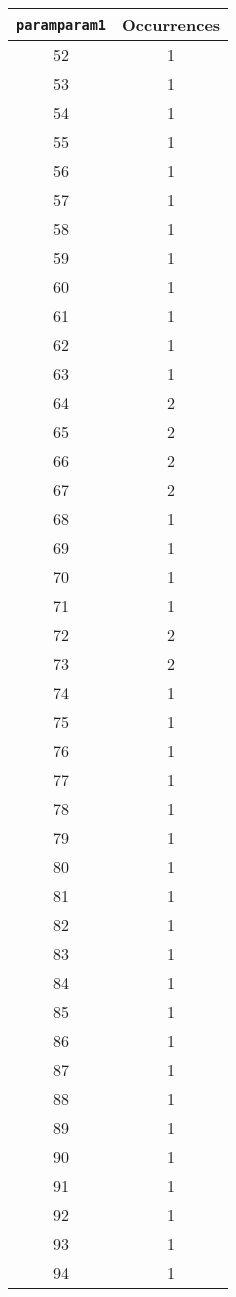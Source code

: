 \documentclass[letterpaper, 12pt]{article}
\begin{document}
\begin{longtable}{|c|c|}
\hline
\textbf{\texttt{paramparam1}} & \textbf{Occurrences} \\
\hline
52 & 1 \\
\hline
53 & 1 \\
\hline
54 & 1 \\
\hline
55 & 1 \\
\hline
56 & 1 \\
\hline
57 & 1 \\
\hline
58 & 1 \\
\hline
59 & 1 \\
\hline
60 & 1 \\
\hline
61 & 1 \\
\hline
62 & 1 \\
\hline
63 & 1 \\
\hline
64 & 2 \\
\hline
65 & 2 \\
\hline
66 & 2 \\
\hline
67 & 2 \\
\hline
68 & 1 \\
\hline
69 & 1 \\
\hline
70 & 1 \\
\hline
71 & 1 \\
\hline
72 & 2 \\
\hline
73 & 2 \\
\hline
74 & 1 \\
\hline
75 & 1 \\
\hline
76 & 1 \\
\hline
77 & 1 \\
\hline
78 & 1 \\
\hline
79 & 1 \\
\hline
80 & 1 \\
\hline
81 & 1 \\
\hline
82 & 1 \\
\hline
83 & 1 \\
\hline
84 & 1 \\
\hline
85 & 1 \\
\hline
86 & 1 \\
\hline
87 & 1 \\
\hline
88 & 1 \\
\hline
89 & 1 \\
\hline
90 & 1 \\
\hline
91 & 1 \\
\hline
92 & 1 \\
\hline
93 & 1 \\
\hline
94 & 1 \\

\end{longtable}
\end{document}
